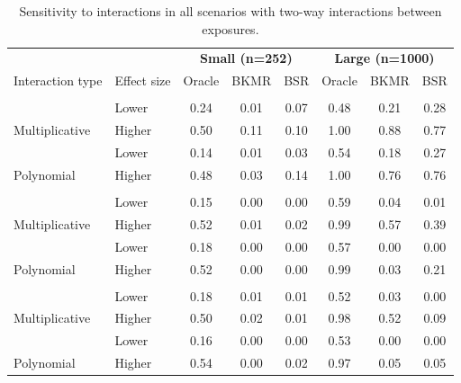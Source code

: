 \documentclass[12pt, twoside]{amherstthesis}
\begin{document}
\begin{table}

\caption{\label{tab:twowaytab}Sensitivity to interactions in all scenarios with two-way interactions between exposures.}
\centering
\begin{tabular}[t]{llcccccc}
\toprule
\multicolumn{2}{c}{\textbf{ }} & \multicolumn{3}{c}{\textbf{Small (n=252)}} & \multicolumn{3}{c}{\textbf{Large (n=1000)}} \\
\cmidrule(l{3pt}r{3pt}){3-5} \cmidrule(l{3pt}r{3pt}){6-8}
Interaction type & Effect size & Oracle & BKMR & BSR & Oracle & BKMR & BSR\\
\midrule
\addlinespace[0.3em]
\multicolumn{8}{l}{\textbf{Hg-Ni}}\\
 & Lower & 0.24 & 0.01 & 0.07 & 0.48 & 0.21 & 0.28\\

\multirow{-2}{*}{\raggedright\arraybackslash \hspace{1em}Multiplicative} & Higher & 0.50 & 0.11 & 0.10 & 1.00 & 0.88 & 0.77\\
\addlinespace
 & Lower & 0.14 & 0.01 & 0.03 & 0.54 & 0.18 & 0.27\\

\multirow{-2}{*}{\raggedright\arraybackslash \hspace{1em}Polynomial} & Higher & 0.48 & 0.03 & 0.14 & 1.00 & 0.76 & 0.76\\
\addlinespace
\addlinespace[0.3em]
\multicolumn{8}{l}{\textbf{Cd-As}}\\
 & Lower & 0.15 & 0.00 & 0.00 & 0.59 & 0.04 & 0.01\\

\multirow{-2}{*}{\raggedright\arraybackslash \hspace{1em}Multiplicative} & Higher & 0.52 & 0.01 & 0.02 & 0.99 & 0.57 & 0.39\\
\addlinespace
 & Lower & 0.18 & 0.00 & 0.00 & 0.57 & 0.00 & 0.00\\

\multirow{-2}{*}{\raggedright\arraybackslash \hspace{1em}Polynomial} & Higher & 0.52 & 0.00 & 0.00 & 0.99 & 0.03 & 0.21\\
\addlinespace
\addlinespace[0.3em]
\multicolumn{8}{l}{\textbf{Ni-Co}}\\
 & Lower & 0.18 & 0.01 & 0.01 & 0.52 & 0.03 & 0.00\\

\multirow{-2}{*}{\raggedright\arraybackslash \hspace{1em}Multiplicative} & Higher & 0.50 & 0.02 & 0.01 & 0.98 & 0.52 & 0.09\\
\addlinespace
 & Lower & 0.16 & 0.00 & 0.00 & 0.53 & 0.00 & 0.00\\

\multirow{-2}{*}{\raggedright\arraybackslash \hspace{1em}Polynomial} & Higher & 0.54 & 0.00 & 0.02 & 0.97 & 0.05 & 0.05\\
\bottomrule
\end{tabular}
\end{table}
\end{document}
